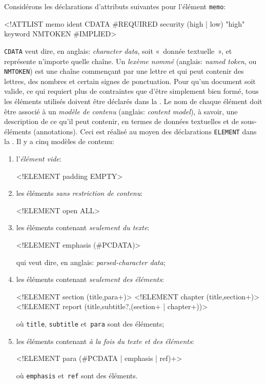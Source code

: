 \hspace*{-7pt}Considérons les déclarations d'attributs suivantes pour
l'élément \texttt{memo}:
\begin{sverb}
<!ATTLIST memo ident      CDATA          #REQUIRED
               security   (high | low)   "high"
               keyword    NMTOKEN        #IMPLIED>
\end{sverb}
\texttt{CDATA} veut dire, en anglais: \emph{character data}, soit
«~donnée textuelle~», et représente n'importe quelle chaîne. Un
\emph{lexème nommé} (anglais: \emph{named token}, ou \texttt{NMTOKEN})
est une chaîne commençant par une lettre et qui peut contenir des
lettres, des nombres et certain signes de ponctuation. Pour qu'un
document soit valide, ce qui requiert plus de contraintes que d'être
simplement bien formé, tous les éléments utilisés doivent être
déclarés dans la \DTD. Le nom de chaque élément doit être associé à un
\emph{modèle de contenu} (anglais: \emph{content model}), à savoir,
une description de ce qu'il peut contenir, en termes de données
textuelles et de sous-éléments (annotations). Ceci est réalisé au
moyen des déclarations \texttt{ELEMENT} dans la \DTD. Il y a cinq
modèles de contenu:
\begin{enumerate}

  \item l'\emph{élément vide}:
\begin{sverb}
<!ELEMENT padding EMPTY>
\end{sverb}

  \item les éléments \emph{sans restriction de contenu}:
\begin{sverb}
<!ELEMENT open ALL>
\end{sverb}

  \item les éléments contenant \emph{seulement du texte}:
\begin{sverb}
<!ELEMENT emphasis (#PCDATA)>
\end{sverb}
qui veut dire, en anglais: \emph{parsed-character data};

\bigskip

  \item les éléments contenant \emph{seulement des éléments}:
\begin{sverb}
<!ELEMENT section (title,para+)>
<!ELEMENT chapter (title,section+)>
<!ELEMENT report (title,subtitle?,(section+ | chapter+))>
\end{sverb}
où \texttt{title}, \texttt{subtitle} et~\texttt{para} sont des
éléments;

\bigskip

\item les éléments contenant \emph{à la fois du texte et des
    éléments}:
\begin{sverb}
<!ELEMENT para (#PCDATA | emphasis | ref)+>
\end{sverb}
où \texttt{emphasis} et~\texttt{ref} sont des éléments.
\end{enumerate}
